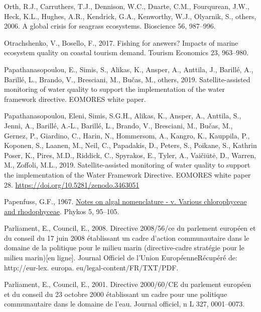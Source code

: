 \documentclass[
  letterpaper,
  11pt,
  english,
  singlespacing,
  headsepline]{MastersDoctoralThesis}
\newlength{\cslhangindent}
\newenvironment{CSLReferences}[2] %
 {\begin{list}{}{%
  \setlength{\itemindent}{0pt}
  \setlength{\leftmargin}{0pt}
  \setlength{\parsep}{0pt}
  \ifodd #1
   \setlength{\leftmargin}{\cslhangindent}
   \setlength{\itemindent}{-1\cslhangindent}
  \fi
  \setlength{\itemsep}{#2\baselineskip}}}
 {\end{list}}
\begin{document}
\begin{CSLReferences}{1}{0}
Orth, R.J., Carruthers, T.J., Dennison, W.C., Duarte, C.M., Fourqurean,
J.W., Heck, K.L., Hughes, A.R., Kendrick, G.A., Kenworthy, W.J.,
Olyarnik, S., others, 2006. A global crisis for seagrass ecosystems.
Bioscience 56, 987--996.

Otrachshenko, V., Bosello, F., 2017. Fishing for answers? Impacts of
marine ecosystem quality on coastal tourism demand. Tourism Economics
23, 963--980.

Papathanasopoulou, E., Simis, S., Alikas, K., Ansper, A., Anttila, J.,
Barillé, A., Barillé, L., Brando, V., Bresciani, M., Bučas, M., others,
2019. Satellite-assisted monitoring of water quality to support the
implementation of the water framework directive. EOMORES white paper.

Papathanasopoulou, Eleni, Simis, S.G.H., Alikas, K., Ansper, A.,
Anttila, S., Jenni, A., Barillé, A.-L., Barillé, L., Brando, V.,
Bresciani, M., Bučas, M., Gernez, P., Giardino, C., Harin, N.,
Hommersom, A., Kangro, K., Kauppila, P., Koponen, S., Laanen, M., Neil,
C., Papadakis, D., Peters, S., Poikane, S., Kathrin Poser, K., Pires,
M.D., Riddick, C., Spyrakos, E., Tyler, A., Vaičiūtė, D., Warren, M.,
Zoffoli, M.L., 2019. {Satellite-assisted monitoring of water quality to
support the implementation of the Water Framework Directive}. EOMORES
white paper 28. \url{https://doi.org/10.5281/zenodo.3463051}

Papenfuss, G.F., 1967.
\href{https://marinespecies.org/aphia.php?p\%20=\%20sourcedetails&id\%20=\%20303450}{Notes
on algal nomenclature - v. Various chlorophyceae and rhodophyceae}.
Phykos 5, 95--105.

Parliament, E., Council, E., 2008. Directive 2008/56/ce du parlement
europ{é}en et du conseil du 17 juin 2008 {é}tablissant un cadre d'action
communautaire dans le domaine de la politique pour le milieu marin
(directive-cadre {\guillemotleft}strat{é}gie pour le milieu
marin{\guillemotright}){[}en ligne{]}. Journal Officiel de l'Union
Europ{é}enneR{é}cup{é}r{é} de: http://eur-lex. europa.
eu/legal-content/FR/TXT/PDF.

Parliament, E., Council, E., 2001. Directive 2000/60/CE du parlement
europ{é}en et du conseil du 23 octobre 2000 {é}tablissant un cadre pour
une politique communautaire dans le domaine de l'eau. Journal officiel,
n L 327, 0001--0073.


\end{CSLReferences}
\end{document}
